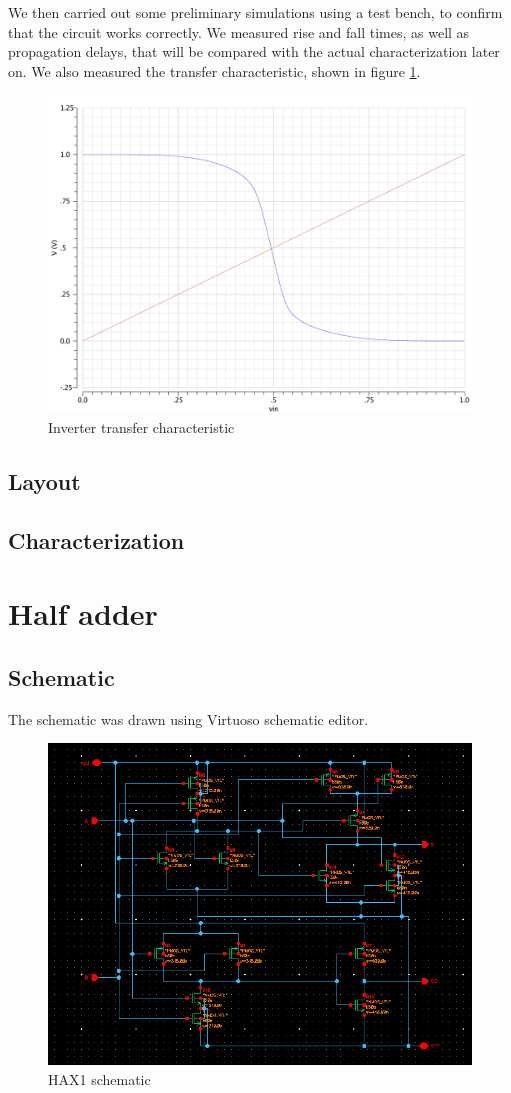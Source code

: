 \documentclass[a4paper]{article}
\begin{document}
We then carried out some preliminary simulations using a test bench, to confirm that the circuit works correctly. We measured rise and fall times, as well as propagation delays, that will be compared with the actual characterization later on. We also measured the transfer characteristic, shown in figure \ref{fig:inv_tchar}.
\begin{figure}[H]
	\centering
	\includegraphics[width=.7\linewidth]{../INV_X4/INV_X4_transfer_char.pdf}
	\caption{Inverter transfer characteristic}
	\label{fig:inv_tchar}
\end{figure}


\subsection{Layout}
\subsection{Characterization}

\section{Half adder}
\subsection{Schematic}
The schematic was drawn using Virtuoso schematic editor.

\begin{figure}[H]
      \centering
       \includegraphics[width=12cm]{./Images/HA/HAX1_schematic.png}
\caption{HAX1 schematic}
\label{fig: HAX1_sch}
\end{figure}
\end{document}
